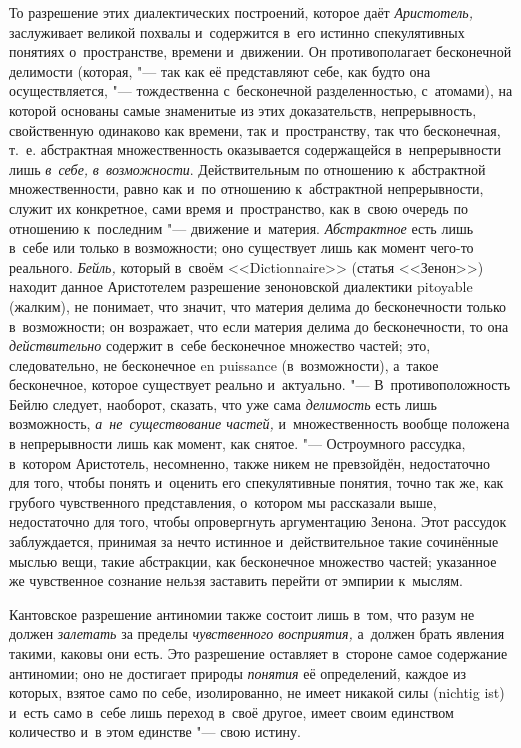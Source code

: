 То разрешение этих диалектических построений, которое даёт {\em Аристотель,}
заслуживает великой похвалы и~содержится в~его истинно спекулятивных понятиях
о~пространстве, времени и~движении. Он противополагает бесконечной делимости
(которая, "--- так как её представляют себе, как будто она осуществляется, "---
тождественна с~бесконечной разделенностью, с~атомами), на которой основаны
самые знаменитые из этих доказательств, непрерывность, свойственную одинаково
как времени, так и~пространству, так что бесконечная, т.~е. абстрактная
множественность оказывается содержащейся в~непрерывности лишь {\em в~себе,}
{\em в~возможности}. Действительным по отношению к~абстрактной множественности,
равно как и~по отношению к~абстрактной непрерывности, служит их конкретное,
сами время и~пространство, как в~свою очередь по отношению к~последним "---
движение и~материя. {\em Абстрактное} есть лишь в~себе или только в
возможности; оно существует лишь как момент чего-то реального. {\em Бейль,}
который в~своём <<Dic\-tion\-naire>> (статья <<Зенон>>) находит данное
Аристотелем разрешение зеноновской диалектики pitoyable (жалким), не понимает,
что значит, что материя делима до бесконечности только в~возможности; он
возражает, что если материя делима до бесконечности, то она {\em действительно}
содержит в~себе бесконечное множество частей; это, следовательно, не
бесконечное en puissance (в~возможности), а~такое бесконечное, которое
существует реально и~актуально. "--- В~противоположность Бейлю следует,
наоборот, сказать, что уже сама {\em делимость} есть лишь возможность,
{\em а~не~существование частей,} и~множественность вообще положена в
непрерывности лишь как момент, как снятое. "--- Остроумного рассудка, в~котором
Аристотель, несомненно, также никем не превзойдён, недостаточно для того, чтобы
понять и~оценить его спекулятивные понятия, точно так же, как грубого
чувственного представления, о~котором мы рассказали выше, недостаточно для
того, чтобы опровергнуть аргументацию Зенона. Этот рассудок заблуждается,
принимая за нечто истинное и~действительное такие сочинённые мыслью вещи, такие
абстракции, как бесконечное множество частей; указанное же чувственное сознание
нельзя заставить перейти от эмпирии к~мыслям.

Кантовское разрешение антиномии также состоит лишь в~том, что разум не должен
{\em залетать} за пределы {\em чувственного восприятия,} а~должен брать явления
такими, каковы они есть. Это разрешение оставляет в~стороне самое содержание
антиномии; оно не достигает природы {\em понятия} её определений, каждое из
которых, взятое само по себе, изолированно, не имеет никакой силы (nich\-tig
ist) и~есть само в~себе лишь переход в~своё другое, имеет своим единством
количество и~в этом единстве "--- свою истину.\label{bkm:bm88b}

